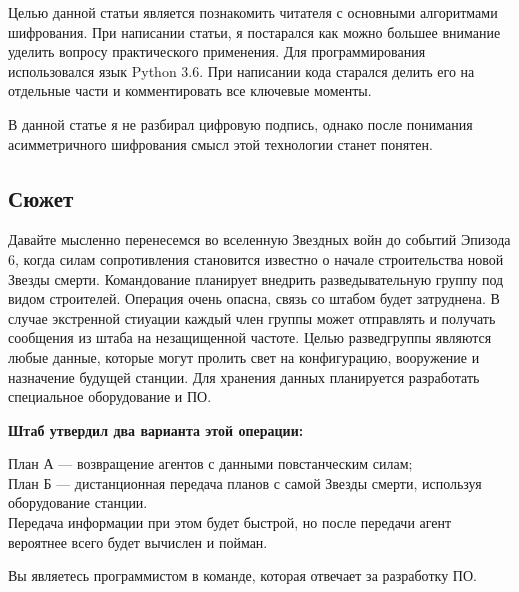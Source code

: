 \documentclass[12pt]{article}
\begin{document}
    \vspace{0.5cm}
    Целью данной статьи является познакомить читателя с основными алгоритмами шифрования. При написании статьи, я постарался как можно большее внимание уделить вопросу практического применения. Для программирования использовался язык Python 3.6. При написании кода старался делить его на отдельные части и комментировать все ключевые моменты.
    \vspace{0.5cm}
    
    В данной статье я не разбирал цифровую подпись, однако после понимания асимметричного шифрования смысл этой технологии станет понятен.
    
    \subsection{Сюжет}
    Давайте мысленно перенесемся во вселенную Звездных войн до событий Эпизода 6, когда силам сопротивления становится известно о начале строительства новой Звезды смерти. Командование планирует внедрить разведывательную группу под видом строителей. Операция очень опасна, связь со штабом будет затруднена. В случае экстренной стиуации каждый член группы может отправлять и получать сообщения из штаба на незащищенной частоте.
    \vspace{0.5cm}
    Целью разведгруппы являются любые данные, которые могут пролить свет на конфигурацию, вооружение и назначение будущей станции. Для хранения данных планируется разработать специальное оборудование и ПО.
    
    \vspace{0.5cm}
    
    \textbf{Штаб утвердил два варианта этой операции:}
    
    \vspace{0.5cm}
   
    План А — возвращение агентов с данными повстанческим силам;
    \\
    План Б — дистанционная передача планов с самой Звезды смерти, используя оборудование станции.
    \\
    Передача информации при этом будет быстрой, но после передачи агент вероятнее всего будет вычислен и пойман.
    
    \vspace{0.5cm}
    
    Вы являетесь программистом в команде, которая отвечает за разработку ПО.
   
   \vspace{0.5cm}
    
\end{document}
